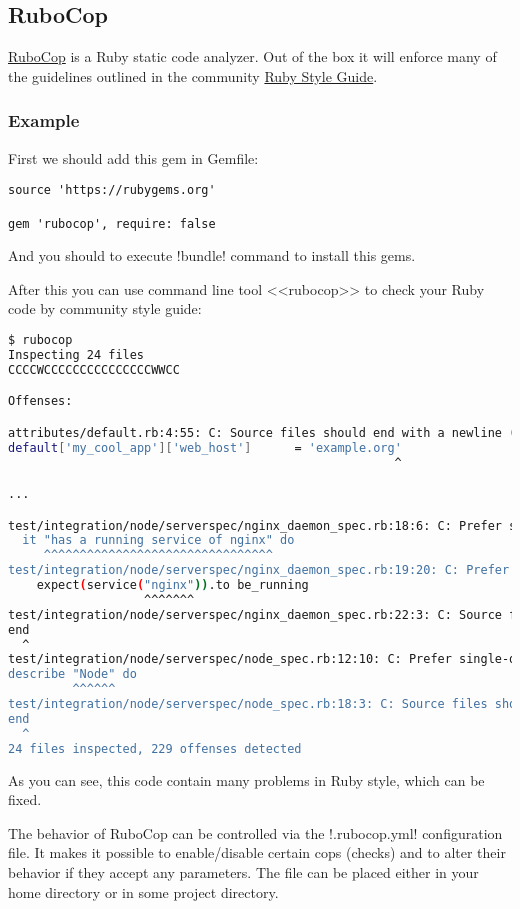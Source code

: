 \subsection{RuboCop}

\href{https://github.com/bbatsov/rubocop}{RuboCop} is a Ruby static code analyzer. Out of the box it will enforce many of the guidelines outlined in the community \href{https://github.com/bbatsov/ruby-style-guide}{Ruby Style Guide}.

\subsubsection{Example}

First we should add this gem in Gemfile:

\begin{lstlisting}[label=lst:testing-test-kitchen1]
source 'https://rubygems.org'

gem 'rubocop', require: false
\end{lstlisting}

And you should to execute \inline!bundle! command to install this gems.

After this you can use command line tool <<rubocop>> to check your Ruby code by community style guide:

\begin{lstlisting}[language=Bash,label=lst:testing-robocop1]
$ rubocop
Inspecting 24 files
CCCCWCCCCCCCCCCCCCCCWWCC

Offenses:

attributes/default.rb:4:55: C: Source files should end with a newline (\n).
default['my_cool_app']['web_host']      = 'example.org'
                                                      ^

...

test/integration/node/serverspec/nginx_daemon_spec.rb:18:6: C: Prefer single-quoted strings when you don't need string interpolation or special symbols.
  it "has a running service of nginx" do
     ^^^^^^^^^^^^^^^^^^^^^^^^^^^^^^^^
test/integration/node/serverspec/nginx_daemon_spec.rb:19:20: C: Prefer single-quoted strings when you don't need string interpolation or special symbols.
    expect(service("nginx")).to be_running
                   ^^^^^^^
test/integration/node/serverspec/nginx_daemon_spec.rb:22:3: C: Source files should end with a newline (\n).
end
  ^
test/integration/node/serverspec/node_spec.rb:12:10: C: Prefer single-quoted strings when you don't need string interpolation or special symbols.
describe "Node" do
         ^^^^^^
test/integration/node/serverspec/node_spec.rb:18:3: C: Source files should end with a newline (\n).
end
  ^
24 files inspected, 229 offenses detected
\end{lstlisting}

As you can see, this code contain many problems in Ruby style, which can be fixed.

The behavior of RuboCop can be controlled via the \inline!.rubocop.yml! configuration file. It makes it possible to enable/disable certain cops (checks) and to alter their behavior if they accept any parameters. The file can be placed either in your home directory or in some project directory.